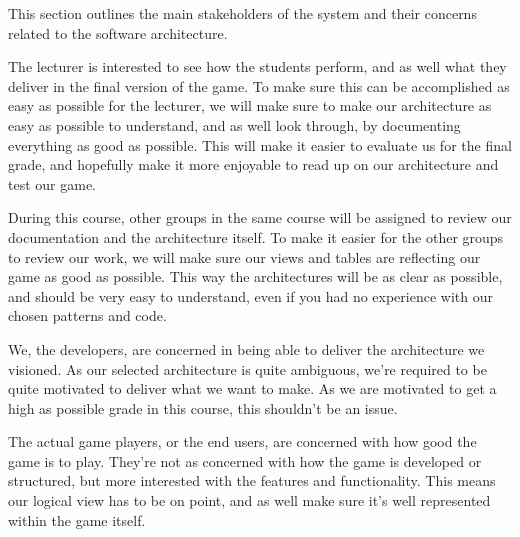 This section outlines the main stakeholders of the system and their concerns related to the software architecture.

The lecturer is interested to see how the students perform, and as well what they deliver in the final version of the game. To make sure this can be accomplished as easy as possible for the lecturer, we will make sure to make our architecture as easy as possible to understand, and as well look through, by documenting everything as good as possible. This will make it easier to evaluate us for the final grade, and hopefully make it more enjoyable to read up on our architecture and test our game.

During this course, other groups in the same course will be assigned to review our documentation and the architecture itself. To make it easier for the other groups to review our work, we will make sure our views and tables are reflecting our game as good as possible. This way the architectures will be as clear as possible, and should be very easy to understand, even if you had no experience with our chosen patterns and code.

We, the developers, are concerned in being able to deliver the architecture we visioned. As our selected architecture is quite ambiguous, we're required to be quite motivated to deliver what we want to make. As we are motivated to get a high as possible grade in this course, this shouldn't be an issue.

The actual game players, or the end users, are concerned with how good the game is to play. They're not as concerned with how the game is developed or structured, but more interested with the features and functionality. This means our logical view has to be on point, and as well make sure it's well represented within the game itself.
